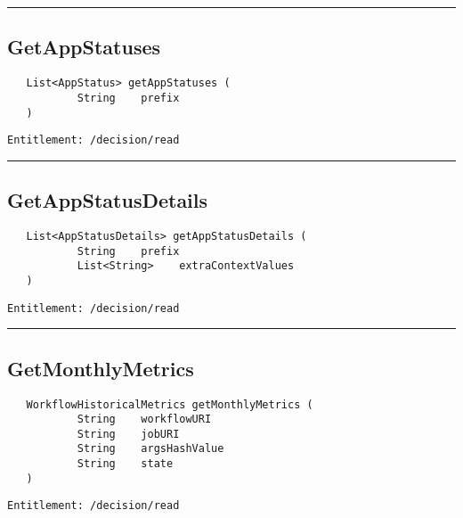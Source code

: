 \rule{12cm}{2pt}
\subsection{GetAppStatuses}
\label{Api:GetAppStatuses}
\begin{verbatim}
   List<AppStatus> getAppStatuses (
           String    prefix
   )
\end{verbatim}
\begin{Verbatim}[fontsize=\small, formatcom=\color{Maroon}]
  Entitlement: /decision/read
\end{Verbatim}



\rule{12cm}{2pt}
\subsection{GetAppStatusDetails}
\label{Api:GetAppStatusDetails}
\begin{verbatim}
   List<AppStatusDetails> getAppStatusDetails (
           String    prefix
           List<String>    extraContextValues
   )
\end{verbatim}
\begin{Verbatim}[fontsize=\small, formatcom=\color{Maroon}]
  Entitlement: /decision/read
\end{Verbatim}



\rule{12cm}{2pt}
\subsection{GetMonthlyMetrics}
\label{Api:GetMonthlyMetrics}
\begin{verbatim}
   WorkflowHistoricalMetrics getMonthlyMetrics (
           String    workflowURI
           String    jobURI
           String    argsHashValue
           String    state
   )
\end{verbatim}
\begin{Verbatim}[fontsize=\small, formatcom=\color{Maroon}]
  Entitlement: /decision/read
\end{Verbatim}



